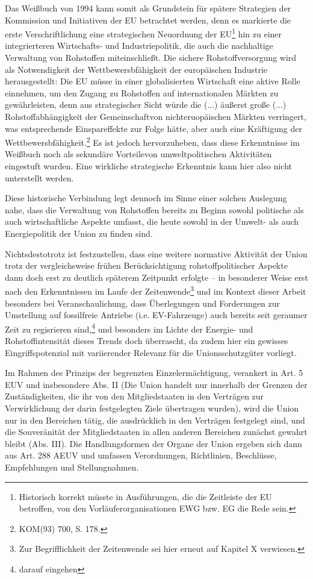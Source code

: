 \documentclass[12pt,a4paper,oneside]{book} %
\begin{document}
Das Weißbuch von 1994 kann somit als Grundstein für spätere Strategien der Kommission und Initiativen der EU betrachtet werden, denn es markierte die erste Verschriftlichung eine strategischen Neuordnung der EU\footnote{Historisch korrekt müsste in Ausführungen, die die Zeitleiste der EU betroffen, von den Vorläuferorganisationen EWG bzw. EG die Rede sein.} hin zu einer integrierteren Wirtschafts- und Industriepolitik, die auch die nachhaltige Verwaltung von Rohstoffen miteinschließt. Die sichere Rohstoffversorgung wird als Notwendigkeit der Wettbewersbfähigkeit der europäischen Industrie herausgestellt: Die EU müsse in einer globalisierten Wirtschaft eine aktive Rolle einnehmen, um den Zugang zu  Rohstoffen auf internationalen Märkten zu gewährleisten, denn aus strategischer Sicht würde die \glqq (...) äußerst große (...) Rohstoffabhängigkeit der Gemeinschaft\grqq von nichteruopäischen Märkten verringert, was entsprechende Einspareffekte zur Folge hätte, aber auch eine Kräftigung der Wettbewersbfähigkeit.\footnote{KOM(93) 700, S. 178.} Es ist jedoch hervorzuheben, dass diese Erkenntnisse im Weißbuch noch als \glqq sekundäre Vorteile\grqq von umweltpolitischen Aktivitäten eingestuft wurden. Eine wirkliche strategische Erkenntnis kann hier also nicht unterstellt werden.
	
Diese historische Verbindung legt dennoch im Sinne einer solchen Auslegung nahe, dass die Verwaltung von Rohstoffen bereits zu Beginn sowohl politische als auch wirtschaftliche Aspekte umfasst, die heute sowohl in der Umwelt- als auch Energiepolitik der Union zu finden sind.
	
Nichtsdestotrotz ist festzustellen, dass eine weitere normative Aktivität der Union trotz der vergleichsweise frühen Berücksichtigung rohstoffpolitischer Aspekte dann doch erst zu deutlich späterem Zeitpunkt erfolgte -- in besonderer Weise erst nach den Erkenntnissen im Laufe der Zeitenwende\footnote{Zur Begrifflichkeit der Zeitenwende sei hier erneut auf Kapitel X verwiesen.} und im Kontext dieser Arbeit besonders bei Veranschaulichung, dass Überlegungen und Forderungen zur Umstellung auf fossilfreie Antriebe (i.e. EV-Fahrzeuge) auch bereits seit geraumer Zeit zu regisrieren sind,\footnote{darauf eingehen} und besonders im Lichte der Energie- und Rohstoffintensität dieses Trends doch überrascht, da zudem hier ein gewisses Eingriffspotenzial mit variierender Relevanz für die Unionsschutzgüter vorliegt. 
	
Im Rahmen des Prinzips der begrenzten Einzelermächtigung, verankert in Art. 5 EUV und insbesondere Abs. II (Die Union handelt nur innerhalb der Grenzen der Zuständigkeiten, die ihr von den Mitgliedstaaten in den Verträgen zur Verwirklichung der darin festgelegten Ziele übertragen wurden), wird die Union nur in den Bereichen tätig, die ausdrücklich in den Verträgen festgelegt sind, und  die Souveränität der Mitgliedstaaten in allen anderen Bereichen zunächst gewahrt bleibt (Abs. III).
Die Handlungsformen der Organe der Union ergeben sich dann aus Art. 288 AEUV und umfassen Verordnungen, Richtlinien, Beschlüsse, Empfehlungen und Stellungnahmen.
	
\end{document}
